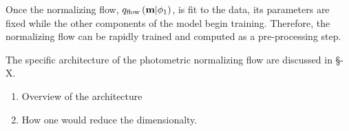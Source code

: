 \documentclass[twocolumn]{aastex631}
\newcommand{\mbs}[1]{\boldsymbol{#1}}
\newcommand{\mcal}[1]{\mathcal{#1}}
\newcommand{\pdf}{\mcal{P}}
\begin{document}
            Once the normalizing flow, $q_{\rm flow}\left(\mathbf{m} | \phi_1\right)$, is fit to the data, its parameters are fixed while the other components of the model begin training. Therefore, the normalizing flow can be rapidly trained and computed as a pre-processing step. 

            The specific architecture of the photometric normalizing flow are discussed in \S-X.

            \begin{enumerate}
                \item Overview of the architecture
                \item How one would reduce the dimensionalty.
            \end{enumerate}

            





    
\end{document}
